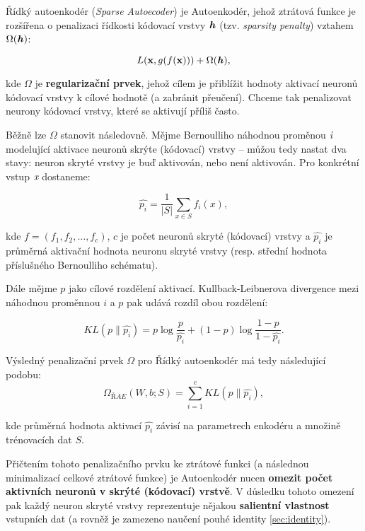 Řídký autoenkodér (\emph{Sparse Autoecoder}) je Autoenkodér, jehož ztrátová funkce je rozšířena o penalizaci řídkosti kódovací vrstvy $\textbf{\emph{h}}$ (tzv. \emph{sparsity penalty}) vztahem $\Omega(\textbf{\emph{h}})$:

\begin{equation}
    L(\mathbf{x}, g(f(\mathbf{x}))) + \Omega(\textbf{\emph{h}}),
\end{equation}

kde $\Omega$ je \textbf{regularizační prvek}, jehož cílem je přiblížit hodnoty aktivací neuronů kódovací vrstvy k cílové hodnotě (a zabránit přeučení).
Chceme tak penalizovat neurony kódovací vrstvy, které se aktivují příliš často.

Běžně lze $\Omega$ stanovit následovně. Mějme Bernoulliho náhodnou proměnou $\emph{i}$ modelující aktivace neuronů skrýte (kódovací) vrstvy – můžou tedy nastat dva stavy: neuron skryté vrstvy je buď aktivován, nebo není aktivován.
Pro konkrétní vstup $\emph{x}$ dostaneme:

\begin{equation}
    \hat{p_i} = \frac{1}{|S|}\sum_{x \in S}^{}f_i(x),
\end{equation}

kde $ f = (f_1, f_2, \dots, f_c)$, $c$ je počet neuronů skryté (kódovací) vrstvy a $\hat{p_i}$ je průměrná aktivační hodnota neuronu skryté vrstvy (resp. střední hodnota příslušného Bernoulliho schématu).

Dále mějme $p$ jako cílové rozdělení aktivací.
Kullback-Leibnerova divergence mezi náhodnou proměnnou $i$ a $p$ pak udává rozdíl obou rozdělení:

\begin{equation}
    KL(p \parallel \hat{p_i}) = p \log \frac{p}{\hat{p_i}} + (1 - p) \log \frac{1 - p}{1 - \hat{p_i}}.
\end{equation}

Výsledný penalizační prvek $\Omega$ pro Řídký autoenkodér má tedy následující podobu:
\begin{equation}
    \Omega_{ŘAE}(W, b; S) = \sum_{i=1}^{c}KL(p \parallel \hat{p_i}),
\end{equation}

kde průměrná hodnota aktivací $\hat{p_i}$ závisí na parametrech enkodéru a množině trénovacích dat $S$. 

Přičtením tohoto penalizačního prvku ke ztrátové funkci (a následnou minimalizací celkové ztrátové funkce) je Autoenkodér nucen \textbf{omezit počet aktivních neuronů v skrýté (kódovací) vrstvě}.
V důsledku tohoto omezení pak každý neuron skryté vrstvy reprezentuje nějakou \textbf{salientní vlastnost} vstupních dat (a rovněž je zamezeno naučení pouhé identity \autoref{sec:identity}).

